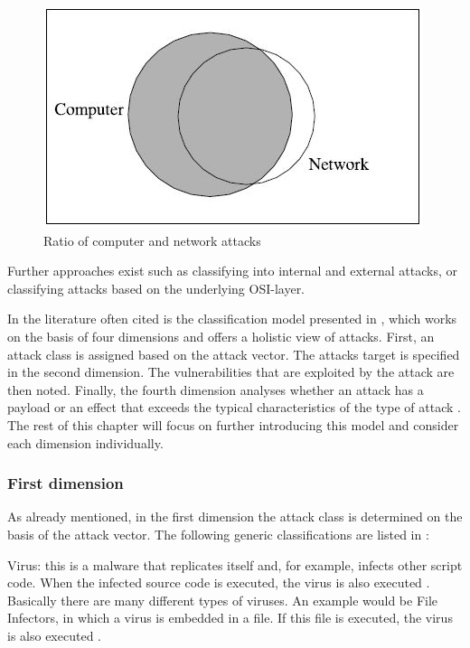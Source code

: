 \documentclass[conference]{IEEEtran}
\begin{document}
\begin{figure}[htbp]  
\centerline{\includegraphics[scale=.90]{computer-network-attacks.jpg}}
\caption{Ratio of computer and network attacks \cite{b2}}
\end{figure}

\medskip Further approaches exist such as classifying into internal and external attacks, or classifying attacks based on the underlying OSI-layer.

\medskip In the literature often cited is the classification model presented in \cite{b5}, which works on the basis of four dimensions and offers a holistic view of attacks. First, an attack class is assigned based on the attack vector. The attacks target is specified in the second dimension. The vulnerabilities that are exploited by the attack are then noted. Finally, the fourth dimension analyses whether an attack has a payload or an effect that exceeds the typical characteristics of the type of attack \cite{b5} . The rest of this chapter will focus on further introducing this model and consider each dimension individually.

\subsubsection{First dimension}

\medskip As already mentioned, in the first dimension the attack class is determined on the basis of the attack vector. The following generic classifications are listed in \cite{b5}:

\smallskip Virus: this is a malware that replicates itself and, for example, infects other script code. When the infected source code is executed, the virus is also executed \cite{b6}.  Basically there are many different types of viruses. An example would be File Infectors, in which a virus is embedded in a file. If this file is executed, the virus is also executed \cite{b2}.
\end{document}
